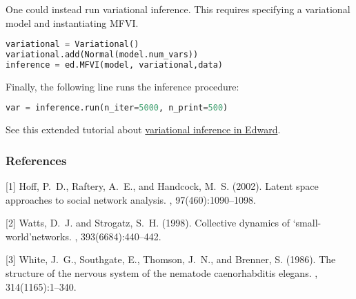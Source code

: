 One could instead run variational inference. This requires specifying a variational model and instantiating MFVI.
\begin{lstlisting}[language=Python]
variational = Variational()
variational.add(Normal(model.num_vars))
inference = ed.MFVI(model, variational,data)
\end{lstlisting}
Finally, the following line runs the inference procedure:
\begin{lstlisting}[language=Python]
var = inference.run(n_iter=5000, n_print=500)
\end{lstlisting}
See this extended tutorial about 
\href{tut_KLqp.html}{variational inference in Edward}.

\subsubsection{References}
\begin{thebibliography}{}
[1] Hoff, P.~D., Raftery, A.~E., and Handcock, M.~S. (2002).
\newblock Latent space approaches to social network analysis.
,
  97(460):1090--1098.

[2] Watts, D.~J. and Strogatz, S.~H. (1998).
\newblock Collective dynamics of ‘small-world’networks.
, 393(6684):440--442.

[3] White, J.~G., Southgate, E., Thomson, J.~N., and Brenner, S. (1986).
\newblock The structure of the nervous system of the nematode caenorhabditis
  elegans.
, 314(1165):1--340.
\end{thebibliography}

